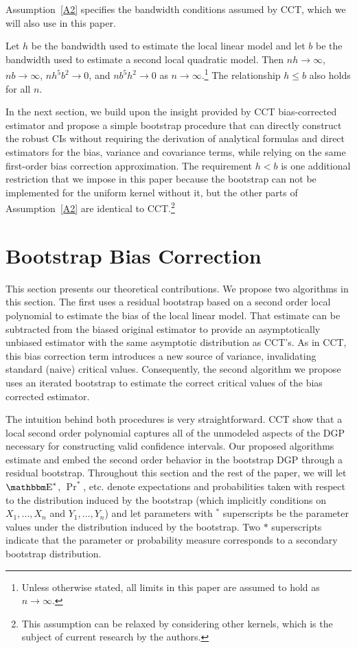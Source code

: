 \documentclass[12pt,fleqn]{article}
\begin{document}
Assumption~\ref{A2} specifies the bandwidth conditions assumed by CCT, which we
will also use in this paper.
\begin{assumption}[Bandwidth]\label{A2}
  Let $h$ be the bandwidth used to estimate the local linear model and let
  $b$ be the bandwidth used to estimate a second local quadratic model. Then
  $n h \to \infty$, $n b \to \infty$, $n h^{5} b^{2} \to 0$, and
  $n b^{5} h^{2} \to 0$ as $n \to \infty$.\footnote{%
    Unless otherwise stated, all limits in this paper are assumed to hold as
    $n \to \infty$.} %
  The relationship $h \leq b$ also holds for all $n$.
\end{assumption}

In the next section, we build upon the insight provided by CCT bias-corrected
estimator and propose a simple bootstrap procedure that can directly construct
the robust CIs without requiring the derivation of analytical formulas and
direct estimators for the bias, variance and covariance terms, while relying on
the same first-order bias correction approximation. The requirement $h < b$ is
one additional restriction that we impose in this paper because the bootstrap
can not be implemented for the uniform kernel without it, but the other parts of
Assumption~\ref{A2} are identical to CCT.\footnote{%
  This assumption can be relaxed by considering other kernels, which is the
  subject of current research by the authors.} %

\section{Bootstrap Bias Correction}\label{boot}

This section presents our theoretical contributions. We propose two algorithms
in this section. The first uses a residual bootstrap based on a second
order local polynomial to estimate the bias of the local linear model. That
estimate can be subtracted from the biased original estimator to provide an
asymptotically unbiased estimator with the same asymptotic distribution as
CCT's. As in CCT, this bias correction term introduces a new source of variance,
invalidating standard (naive) critical values. Consequently, the second
algorithm we propose uses an iterated bootstrap to estimate the correct
critical values of the bias corrected estimator.

The intuition behind both procedures is very straightforward. CCT show that a
local second order polynomial captures all of the unmodeled aspects of the DGP
necessary for constructing valid confidence intervals. Our proposed algorithms
estimate and embed the second order behavior in the bootstrap DGP through a
residual bootstrap. Throughout this section and the rest of the paper, we will
let $\E^{*}$, $\Pr^{*}$, etc. denote expectations and probabilities taken with
respect to the distribution induced by the bootstrap (which implicitly
conditions on $X_1,\dots,X_n$ and $Y_1,\dots,Y_n$) and let parameters with
$^{*}$ superscripts be the parameter values under the distribution induced by
the bootstrap. Two $*$ superscripts indicate that the parameter or probability
measure corresponds to a secondary bootstrap distribution.
\end{document}
